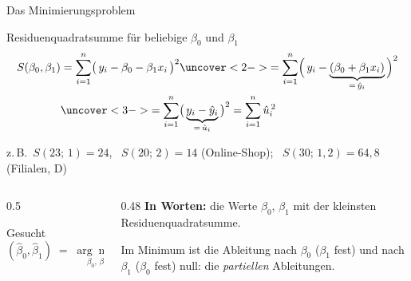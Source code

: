 \documentclass[aspectratio=169,11pt]{beamer}
\begin{document}
\begin{frame}[label=minimierung]{Das Minimierungsproblem}
  \begin{block}{Residuenquadratsumme für beliebige $\beta_0$ und $\beta_1$}
    \vspace{-8pt}
    \begin{align*}
      S(\beta_0,\beta_1)
        &= \sum_{i=1}^{n}\bigl(\,y_i - \beta_0 - \beta_1 x_i\,\bigr)^{2}
           \uncover<2->{= \sum_{i=1}^{n}\Bigl(\,y_i - \underbrace{(\beta_0 + \beta_1 x_i)}_{=\,\hat{y}_i}\,\Bigr)^{2}}\\
        &\uncover<3->{= \sum_{i=1}^{n}\bigl(\,\underbrace{y_i - \hat{y}_i}_{=\,\hat{u}_i}\,\bigr)^{2}
           = \sum_{i=1}^{n}\hat{u}_i^{\,2}}
    \end{align*}
    \vspace{-8pt}

    z.\,B.\ $S(23;\,1) = 24$, \ $S(20;\,2) = 14$ (Online-Shop); \ $S(30;\,1{,}2) = 64{,}8$ (Filialen, D)
  \end{block}

  \begin{columns}[T]
    \begin{column}{0.5\textwidth}
      \begin{block}{Gesucht}
        \vspace{-6pt}
        \[
          (\hat{\beta}_0,\hat{\beta}_1) \;=\;
          \underset{\beta_0,\,\beta_1}{\arg\min}\; S(\beta_0,\beta_1)
        \]
        \vspace{-7pt}
      \end{block}
    \end{column}
    \begin{column}{0.48\textwidth}
      \textbf{In Worten:} die Werte $\beta_0$, $\beta_1$ mit der kleinsten
      Residuenquadratsumme.\\[4pt]
      {\footnotesize Im Minimum ist die Ableitung nach $\beta_0$ ($\beta_1$ fest) und nach
        $\beta_1$ ($\beta_0$ fest) null: die \emph{partiellen} Ableitungen.\par}
    \end{column}
  \end{columns}
\end{frame}
\end{document}
